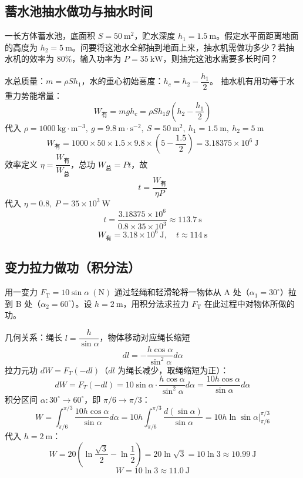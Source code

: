 \subsection{蓄水池抽水做功与抽水时间}
一长方体蓄水池，底面积 $S=50\ \mathrm{m^2}$，贮水深度 $h_1=1.5\ \mathrm{m}$。假定水平面距离地面的高度为 $h_2=5\ \mathrm{m}$。问要将这池水全部抽到地面上来，抽水机需做功多少？若抽水机的效率为 $80\%$，输入功率为 $P=35\ \mathrm{kW}$，则抽完这池水需要多长时间？
\begin{solution}
水总质量：$m=\rho S h_1$，水的重心初始高度：$h_c=h_2-\dfrac{h_1}{2}$。
抽水机有用功等于水重力势能增量：
\[
W_\text{有}=mg h_c=\rho S h_1 g \left(h_2-\frac{h_1}{2}\right)
\]
代入 $\rho=1000\ \mathrm{kg\cdot m^{-3}},\ g=9.8\ \mathrm{m\cdot s^{-2}},\ S=50\ \mathrm{m^2},\ h_1=1.5\ \mathrm{m},\ h_2=5\ \mathrm{m}$
\[
W_\text{有}=1000\times 50 \times 1.5 \times 9.8 \times \left(5-\frac{1.5}{2}\right)=3.18375\times 10^6\ \mathrm{J}
\]
效率定义 $\eta=\dfrac{W_\text{有}}{W_\text{总}}$，总功 $W_\text{总}=Pt$，故
\[
t=\frac{W_\text{有}}{\eta P}
\]
代入 $\eta=0.8,\ P=35\times10^3\ \mathrm{W}$
\[
t=\frac{3.18375\times 10^6}{0.8\times 35\times 10^3}\approx 113.7\ \mathrm{s}
\]
\[
\boxed{W_\text{有}=3.18\times 10^6\ \mathrm{J},\quad t\approx 114\ \mathrm{s}}
\]
\end{solution}
\subsection{变力拉力做功（积分法）}
用一变力 $F_\mathrm{T}=10\sin\alpha\ (\mathrm{N})$ 通过轻绳和轻滑轮将一物体从 A 处（$\alpha_1=30^\circ$）拉到 B 处（$\alpha_2=60^\circ$）。设 $h=2\ \mathrm{m}$，用积分法求拉力 $F_\mathrm{T}$ 在此过程中对物体所做的功。
\begin{solution}
几何关系：绳长 $l=\dfrac{h}{\sin\alpha}$，物体移动对应绳长缩短
\[
dl = -\frac{h \cos\alpha}{\sin^2\alpha} d\alpha
\]
拉力元功 $dW=F_T(-dl)$（$dl$ 为绳长减少，取绳缩短为正）：
\[
dW=F_T (-dl)=10\sin\alpha \cdot \frac{h \cos\alpha}{\sin^2\alpha} d\alpha=\frac{10h \cos\alpha}{\sin\alpha}d\alpha
\]
积分区间 $\alpha\colon 30^\circ \to 60^\circ$，即 $\pi/6 \to \pi/3$：
\[
W=\int_{\pi/6}^{\pi/3}\frac{10h \cos\alpha}{\sin\alpha}d\alpha
=10h \int_{\pi/6}^{\pi/3}\frac{d(\sin\alpha)}{\sin\alpha}
=10h \ln\sin\alpha \bigg|_{\pi/6}^{\pi/3}
\]
代入 $h=2\ \mathrm{m}$：
\[
W=20\left(\ln\frac{\sqrt{3}}{2}-\ln\frac12\right)=20\ln\sqrt{3}=10\ln 3 \approx 10.99\ \mathrm{J}
\]
\[
\boxed{W=10\ln 3 \approx 11.0\ \mathrm{J}}
\]
\end{solution}

